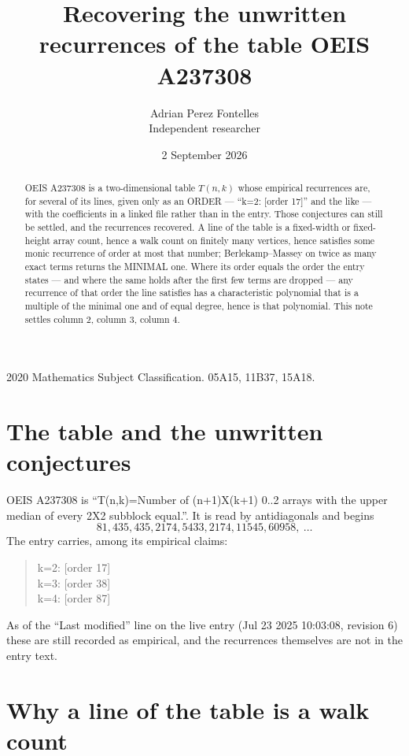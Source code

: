 \documentclass[11pt,a4paper]{article}
\title{Recovering the unwritten recurrences of the table OEIS A237308}
\author{Adrian Perez Fontelles\\ \small Independent researcher}
\date{2 September 2026}
\theoremstyle{plain}
\theoremstyle{definition}
\begin{document}
\maketitle

\begin{abstract}
OEIS A237308 is a two-dimensional table $T(n,k)$ whose empirical recurrences are, for several of
its lines, given only as an ORDER --- ``k=2: [order 17]'' and the like --- with the
coefficients in a linked file rather than in the entry. Those conjectures can still be settled,
and the recurrences recovered. A line of the table is a fixed-width or fixed-height array
count, hence a walk count on finitely many vertices, hence satisfies some monic recurrence of
order at most that number; Berlekamp--Massey on twice as many exact terms returns the MINIMAL
one. Where its order equals the order the entry states --- and where the same holds after the
first few terms are dropped --- any recurrence of that order the line satisfies has a
characteristic polynomial that is a multiple of the minimal one and of equal degree, hence is
that polynomial. This note settles column 2, column 3, column 4.
\end{abstract}

\noindent\small 2020 Mathematics Subject Classification. 05A15, 11B37, 15A18.\normalsize

\section{The table and the unwritten conjectures}

OEIS A237308 is ``T(n,k)=Number of (n+1)X(k+1) 0..2 arrays with the upper median of every 2X2 subblock equal.''. It is read by antidiagonals and begins
\[
81, 435, 435, 2174, 5433, 2174, 11545, 60958,\ \dots
\]
The entry carries, among its empirical claims:
\begin{quote}\small
k=2: [order 17]\\
k=3: [order 38]\\
k=4: [order 87]
\end{quote}
As of the ``Last modified'' line on the live entry (Jul 23 2025 10:03:08, revision 6) these are still
recorded as empirical, and the recurrences themselves are not in the entry text.

\section{Why a line of the table is a walk count}
\end{document}
